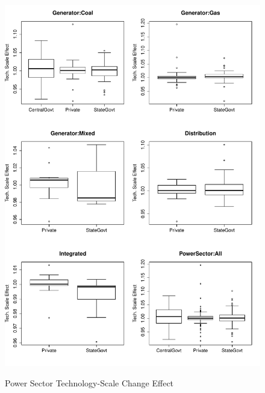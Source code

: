 \begin{figure}[ht]
	\centering
	\caption{Power Sector Technology-Scale Change Effect}
		\includegraphics[width=1.00\textwidth]{chapter03/TechScale.pdf}
	\label{fig:TechScale}
\end{figure}

